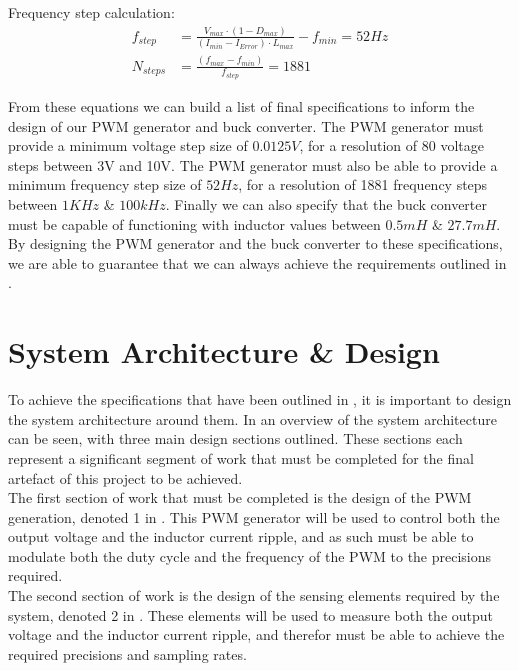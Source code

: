 Frequency step calculation:
\begin{align}
    f_{step}&=\frac{V_{max}\cdot\left(1-D_{max}\right)}{\left(I_{min}-I_{Error}\right)\cdot L_{max}}-f_{min} = 52Hz\\
    N_{steps}&=\frac{\left(f_{max}-f_{min}\right)}{f_{step}} = 1881 \label{E:f_step}
\end{align}

From these equations we can build a list of final specifications to inform the design of our PWM generator and buck converter. The PWM generator must provide a minimum voltage step size of $0.0125V$, for a resolution of 80 voltage steps between 3V and 10V. The PWM generator must also be able to provide a minimum frequency step size of $52Hz$, for a resolution of 1881 frequency steps between $1KHz$ \& $100kHz$. Finally we can also specify that the buck converter must be capable of functioning with inductor values between $0.5mH$ \& $27.7mH$. \\

By designing the PWM generator and the buck converter to these specifications, we are able to guarantee that we can always achieve the requirements outlined in .

\section{System Architecture \& Design}\label{S:system}

To achieve the specifications that have been outlined in , it is important to design the system architecture around them. In  an overview of the system architecture can be seen, with three main design sections outlined. These sections each represent a significant segment of work that must be completed for the final artefact of this project to be achieved. \\

The first section of work that must be completed is the design of the PWM generation, denoted 1 in . This PWM generator will be used to control both the output voltage and the inductor current ripple, and as such must be able to modulate both the duty cycle and the frequency of the PWM to the precisions required. \\

The second section of work is the design of the sensing elements required by the system, denoted 2 in . These elements will be used to measure both the output voltage and the inductor current ripple, and therefor must be able to achieve the required precisions and sampling rates. \\

